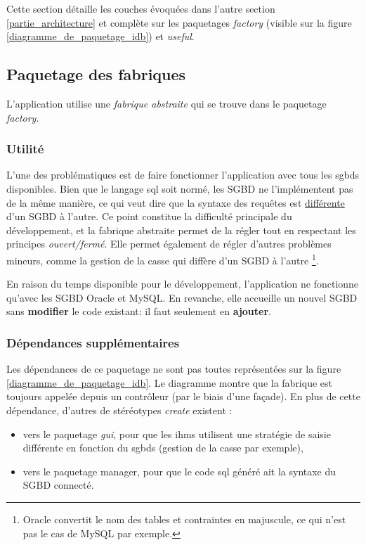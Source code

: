 Cette section détaille les couches évoquées dans l'autre section \ref{partie_architecture} et complète sur les paquetages \textit{factory} (visible sur la figure \ref{diagramme_de_paquetage_idb}) et \textit{useful}.

\subsection{Paquetage des fabriques}
L'application utilise une \textit{fabrique abstraite} qui se trouve dans le paquetage \textit{factory}.

\subsubsection{Utilité}
L'une des problématiques est de faire fonctionner l'application avec tous les \glspl{sgbd} disponibles.
Bien que le langage \gls{sql} soit normé, les SGBD ne l'implémentent pas de la même manière, ce qui veut dire que la syntaxe des requêtes est \underline{différente} d'un SGBD à l'autre.
Ce point constitue la difficulté principale du développement, et la fabrique abstraite permet de la régler tout en respectant les principes \textit{ouvert/fermé}. Elle permet également de régler d'autres problèmes mineurs, comme la gestion de la casse qui diffère d'un SGBD à l'autre
\footnote{\label{casse_et_sgbd}Oracle convertit le nom des tables et contraintes en majuscule, ce qui n'est pas le cas de MySQL par exemple.}.

En raison du temps disponible pour le développement, l'application ne fonctionne qu'avec les SGBD Oracle et MySQL.
En revanche, elle accueille un nouvel SGBD sans \textbf{modifier} le code existant: il faut seulement en \textbf{ajouter}. %

\subsubsection{Dépendances supplémentaires}
Les dépendances de ce paquetage ne sont pas toutes représentées sur la figure \ref{diagramme_de_paquetage_idb}.
Le diagramme montre que la fabrique est toujours appelée depuis un contrôleur (par le biais d'une façade).
En plus de cette dépendance, d'autres de stéréotypes \textit{create} existent :
\begin{itemize}
\item vers le paquetage \textit{gui}, pour que les \glspl{ihm} utilisent une stratégie de saisie différente en fonction du \glspl{sgbd} (gestion de la casse par exemple),
\item vers le paquetage manager, pour que le code \gls{sql} généré ait la syntaxe du SGBD connecté.
\end{itemize}

